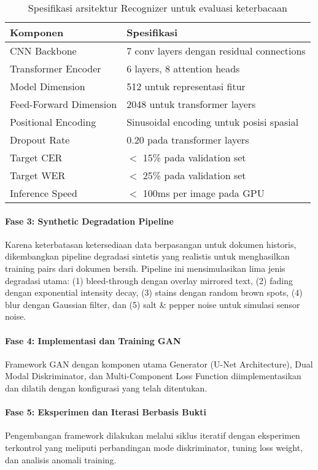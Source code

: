 \documentclass[12pt,a4paper]{article}
\begin{document}
\begin{table}[H]
\centering
\caption{Spesifikasi arsitektur Recognizer untuk evaluasi keterbacaan}
\label{tab:recognizer-spec-ch3}
\small
\begin{tabular}{|l|l|}
\hline
\textbf{Komponen} & \textbf{Spesifikasi} \\
\hline
CNN Backbone & 7 conv layers dengan residual connections \\
\hline
Transformer Encoder & 6 layers, 8 attention heads \\
\hline
Model Dimension & 512 untuk representasi fitur \\
\hline
Feed-Forward Dimension & 2048 untuk transformer layers \\
\hline
Positional Encoding & Sinusoidal encoding untuk posisi spasial \\
\hline
Dropout Rate & 0.20 pada transformer layers \\
\hline
Target CER & $<$ 15\% pada validation set \\
\hline
Target WER & $<$ 25\% pada validation set \\
\hline
Inference Speed & $<$ 100ms per image pada GPU \\
\hline
\end{tabular}
\end{table}

\paragraph{Fase 3: Synthetic Degradation Pipeline}
Karena keterbatasan ketersediaan data berpasangan untuk dokumen historis, dikembangkan pipeline degradasi sintetis yang realistis untuk menghasilkan training pairs dari dokumen bersih. Pipeline ini mensimulasikan lima jenis degradasi utama: (1) bleed-through dengan overlay mirrored text, (2) fading dengan exponential intensity decay, (3) stains dengan random brown spots, (4) blur dengan Gaussian filter, dan (5) salt \& pepper noise untuk simulasi sensor noise.

\paragraph{Fase 4: Implementasi dan Training GAN}
Framework GAN dengan komponen utama Generator (U-Net Architecture), Dual Modal Diskriminator, dan Multi-Component Loss Function diimplementasikan dan dilatih dengan konfigurasi yang telah ditentukan.

\paragraph{Fase 5: Eksperimen dan Iterasi Berbasis Bukti}
Pengembangan framework dilakukan melalui siklus iteratif dengan eksperimen terkontrol yang meliputi perbandingan mode diskriminator, tuning loss weight, dan analisis anomali training.
\end{document}
